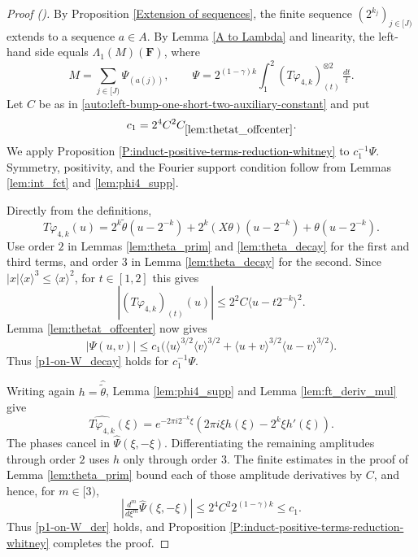 \documentclass[12pt,reqno]{amsart}
\newcommand{\auto}{{({\tiny\faCar})}}
\theoremstyle{plain}
\numberwithin{equation}{section}
\theoremstyle{remark}
\newcommand{\F}{\mathbf{F}}
\begin{document}
\begin{proof}[Proof \auto]
By Proposition \ref{Extension of sequences}, the finite sequence $(2^{k_j})_{j\in[J)}$ extends to a sequence $a\in A$. By Lemma \ref{A to Lambda} and linearity, the left-hand side equals $\Lambda_1(M)(\F)$, where
\[
M=\sum_{j\in[J)}\Psi_{(a(j))},
\qquad
\Psi=2^{(1-\gamma)k}\int_1^2(T\varphi_{4,k})_{(t)}^{\otimes2}\,\tfrac{dt}{t}.
\]
Let $C$ be as in \eqref{auto:left-bump-one-short-two-auxiliary-constant} and put
\[
c_1=2^4C^2C_{\ref{lem:thetat_offcenter}}.
\]
We apply Proposition \ref{P:induct-positive-terms-reduction-whitney} to $c_1^{-1}\Psi$. Symmetry, positivity, and the Fourier support condition follow from Lemmas \ref{lem:int_fct} and \ref{lem:phi4_supp}.

Directly from the definitions,
\[
T\varphi_{4,k}(u)
=2^k\widetilde\theta(u-2^{-k})
+2^k(X\theta)(u-2^{-k})
+\theta(u-2^{-k}).
\]
Use order $2$ in Lemmas \ref{lem:theta_prim} and \ref{lem:theta_decay} for the first and third terms, and order $3$ in Lemma \ref{lem:theta_decay} for the second. Since $|x|\langle x\rangle^3\le\langle x\rangle^2$, for $t\in[1,2]$ this gives
\[
|(T\varphi_{4,k})_{(t)}(u)|
\le2^2C\langle u-t2^{-k}\rangle^2.
\]
Lemma \ref{lem:thetat_offcenter} now gives
\[
|\Psi(u,v)|
\le c_1\bigl(
\langle u\rangle^{3/2}\langle v\rangle^{3/2}
+\langle u+v\rangle^{3/2}\langle u-v\rangle^{3/2}
\bigr).
\]
Thus \eqref{p1-on-W_decay} holds for $c_1^{-1}\Psi$.

Writing again $h=\widehat{\widetilde\theta}$, Lemma \ref{lem:phi4_supp} and Lemma \ref{lem:ft_deriv_mul} give
\[
\widehat{T\varphi_{4,k}}(\xi)
=e^{-2\pi i2^{-k}\xi}
\left(2\pi i\xi h(\xi)-2^k\xi h'(\xi)\right).
\]
The phases cancel in $\widehat\Psi(\xi,-\xi)$. Differentiating the remaining amplitudes through order $2$ uses $h$ only through order $3$. The finite estimates in the proof of Lemma \ref{lem:theta_prim} bound each of those amplitude derivatives by $C$, and hence, for $m\in[3)$,
\[
\left|\tfrac{d^m}{d\xi^m}\widehat\Psi(\xi,-\xi)\right|
\le2^4C^2 2^{(1-\gamma)k}
\le c_1.
\]
Thus \eqref{p1-on-W_der} holds, and Proposition \ref{P:induct-positive-terms-reduction-whitney} completes the proof.
\end{proof}
\end{document}
